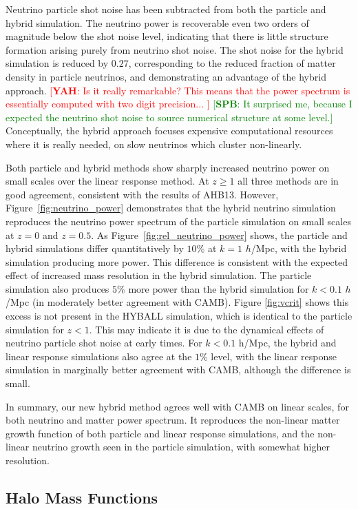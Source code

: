 \documentclass[useAMS, usenatbib]{mnras}
\newcommand{\spb}[1]{{\textcolor{green}{[{\bf SPB}: #1]}}}
\newcommand{\yah}[1]{{\textcolor{red}{[{\bf YAH}: #1]}}}
\begin{document}
Neutrino particle shot noise has been subtracted from both the particle and hybrid simulation. The neutrino power is recoverable even two orders of magnitude below the shot noise level, indicating that there is little structure formation arising purely from neutrino shot noise. The shot noise for the hybrid simulation is reduced by $0.27$, corresponding to the reduced fraction of matter density in particle neutrinos, and demonstrating an advantage of the hybrid approach. \yah{Is it really remarkable? This means that the power spectrum is essentially computed with two digit precision... } \spb{It surprised me, because I expected the neutrino shot noise to source numerical structure at some level.} Conceptually, the hybrid approach focuses expensive computational resources where it is really needed, on slow neutrinos which cluster non-linearly.

Both particle and hybrid methods show sharply increased neutrino power on small scales over the linear response method. At $z \geq 1$ all three methods are in good agreement, consistent with the results of AHB13. However, Figure~\ref{fig:neutrino_power} demonstrates that the hybrid neutrino simulation reproduces the neutrino power spectrum of the particle simulation on small scales at $z = 0$ and $z=0.5$. As Figure~\ref{fig:rel_neutrino_power} shows, the particle and hybrid simulations differ quantitatively by $10\%$ at $k=1$ $h$/Mpc, with the hybrid simulation producing more power. This difference is consistent with the expected effect of increased mass resolution in the hybrid simulation. The particle simulation also produces $5\%$ more power than the hybrid simulation for $k < 0.1$ $h$/Mpc (in moderately better agreement with CAMB). Figure \ref{fig:vcrit} shows this excess is not present in the HYBALL simulation, which is identical to the particle simulation for $z < 1$. This may indicate it is due to the dynamical effects of neutrino particle shot noise at early times. For $k < 0.1$ h/Mpc, the hybrid and linear response simulations also agree at the $1\%$ level, with the linear response simulation in marginally better agreement with CAMB, although the difference is small.

In summary, our new hybrid method agrees well with CAMB on linear scales, for both neutrino and matter power spectrum. It reproduces the non-linear matter growth function of both particle and linear response simulations, and the non-linear neutrino growth seen in the particle simulation, with somewhat higher resolution.

\subsection{Halo Mass Functions}
\label{sec:halomass}
\end{document}
